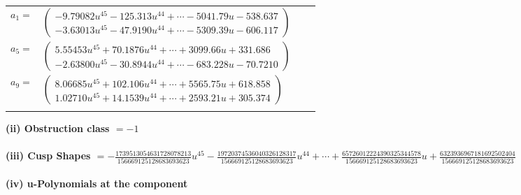 \documentclass[1p]{elsarticle_modified}
\theoremstyle{definition}
\begin{document}
\begin{tabular}{m{7pt} m{180pt} m{7pt} m{180pt} }
\flushright $a_{1}=$&$\begin{pmatrix}-9.79082 u^{45}-125.313 u^{44}+\cdots-5041.79 u-538.637\\-3.63013 u^{45}-47.9190 u^{44}+\cdots-5309.39 u-606.117\end{pmatrix}$ \\
\flushright $a_{5}=$&$\begin{pmatrix}5.55453 u^{45}+70.1876 u^{44}+\cdots+3099.66 u+331.686\\-2.63800 u^{45}-30.8944 u^{44}+\cdots-683.228 u-70.7210\end{pmatrix}$ \\
\flushright $a_{9}=$&$\begin{pmatrix}8.06685 u^{45}+102.106 u^{44}+\cdots+5565.75 u+618.858\\1.02710 u^{45}+14.1539 u^{44}+\cdots+2593.21 u+305.374\end{pmatrix}$\\&\end{tabular}
\flushleft \textbf{(ii) Obstruction class $= -1$}\\~\\
\flushleft \textbf{(iii) Cusp Shapes $= -\frac{1739513054631728078213}{156669125128683693623} u^{45}-\frac{19720374536040326128317}{156669125128683693623} u^{44}+\cdots+\frac{65726012224390325344578}{156669125128683693623} u+\frac{6323936967181692502404}{156669125128683693623}$}\\~\\
\newpage\renewcommand{\arraystretch}{1}
\flushleft \textbf{(iv) u-Polynomials at the component}\newline \\
\end{document}
